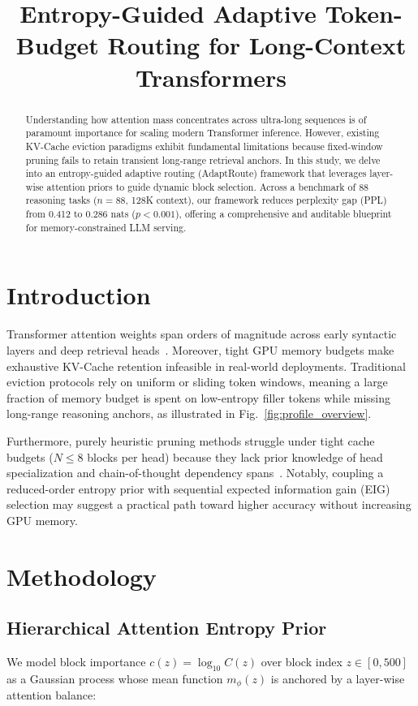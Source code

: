 \documentclass[11pt]{article}
\title{Entropy-Guided Adaptive Token-Budget Routing for Long-Context Transformers}
\begin{document}
\maketitle

\begin{abstract}
Understanding how attention mass concentrates across ultra-long sequences is of paramount importance for scaling modern Transformer inference. However, existing KV-Cache eviction paradigms exhibit fundamental limitations because fixed-window pruning fails to retain transient long-range retrieval anchors. In this study, we delve into an entropy-guided adaptive routing (AdaptRoute) framework that leverages layer-wise attention priors to guide dynamic block selection. Across a benchmark of 88 reasoning tasks ($n = 88$, 128K context), our framework reduces perplexity gap (PPL) from 0.412 to 0.286 nats ($p < 0.001$), offering a comprehensive and auditable blueprint for memory-constrained LLM serving.
\end{abstract}

\section{Introduction}
\label{sec:intro}

Transformer attention weights span orders of magnitude across early syntactic layers and deep retrieval heads~\cite{vaswani2017neurips,dao2022neurips}. Moreover, tight GPU memory budgets make exhaustive KV-Cache retention infeasible in real-world deployments. Traditional eviction protocols rely on uniform or sliding token windows, meaning a large fraction of memory budget is spent on low-entropy filler tokens while missing long-range reasoning anchors, as illustrated in Fig.~\ref{fig:profile_overview}.

Furthermore, purely heuristic pruning methods struggle under tight cache budgets ($N \le 8$ blocks per head) because they lack prior knowledge of head specialization and chain-of-thought dependency spans~\cite{wei2022neurips}. Notably, coupling a reduced-order entropy prior with sequential expected information gain (EIG) selection may suggest a practical path toward higher accuracy without increasing GPU memory.

\section{Methodology}
\label{sec:method}

\subsection{Hierarchical Attention Entropy Prior}
We model block importance $c(z) = \log_{10} C(z)$ over block index $z \in [0, 500]$ as a Gaussian process whose mean function $m_\phi(z)$ is anchored by a layer-wise attention balance:
\end{document}
